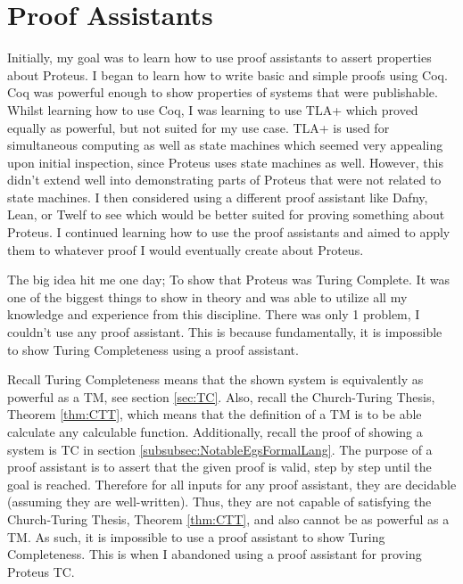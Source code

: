 \chapter{Proof Assistants}\label{app:ProofAssist}

Initially, my goal was to learn how to use proof assistants to assert properties about Proteus.
I began to learn how to write basic and simple proofs using Coq.
Coq was powerful enough to show properties of systems that were publishable.
Whilst learning how to use Coq, I was learning to use TLA+ which proved equally as powerful, but not suited for my use case.
TLA+ is used for simultaneous computing as well as state machines which seemed very appealing upon initial inspection, since Proteus uses state machines as well.
However, this didn't extend well into demonstrating parts of Proteus that were not related to state machines.
I then considered using a different proof assistant like Dafny, Lean, or Twelf to see which would be better suited for proving something about Proteus.
I continued learning how to use the proof assistants and aimed to apply them to whatever proof I would eventually create about Proteus.

The big idea hit me one day; To show that Proteus was Turing Complete.
It was one of the biggest things to show in theory and was able to utilize all my knowledge and experience from this discipline.
There was only 1 problem, I couldn't use any proof assistant.
This is because fundamentally, it is impossible to show Turing Completeness using a proof assistant.

Recall Turing Completeness means that the shown system is equivalently as powerful as a TM, see section \ref{sec:TC}.
Also, recall the Church-Turing Thesis, Theorem \ref{thm:CTT}, which means that the definition of a TM is to be able calculate any calculable function.
Additionally, recall the proof of showing a system is TC in section \ref{subsubsec:NotableEgsFormalLang}.
The purpose of a proof assistant is to assert that the given proof is valid, step by step until the goal is reached.
Therefore for all inputs for any proof assistant, they are decidable (assuming they are well-written).
Thus, they are not capable of satisfying the Church-Turing Thesis, Theorem \ref{thm:CTT}, and also cannot be as powerful as a TM.
As such, it is impossible to use a proof assistant to show Turing Completeness.
This is when I abandoned using a proof assistant for proving Proteus TC.